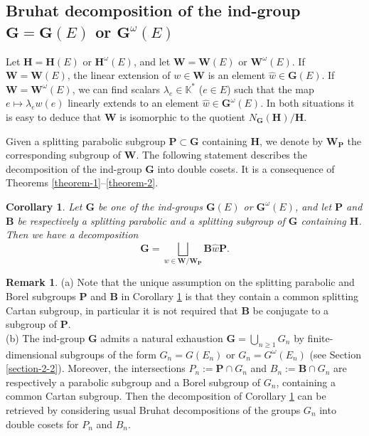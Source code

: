 \documentclass[12pt]{amsart}
\newtheorem{corollary}{Corollary}
\theoremstyle{definition}
\newtheorem{remark}{Remark}
\begin{document}
\subsection{Bruhat decomposition of the ind-group $\mathbf{G}=\mathbf{G}(E)$ or $\mathbf{G}^\omega(E)$}

\label{section-4-3}

Let $\mathbf{H}=\mathbf{H}(E)$ or $\mathbf{H}^\omega(E)$, and let $\mathbf{W}=\mathbf{W}(E)$ or $\mathbf{W}^\omega(E)$.
If $\mathbf{W}=\mathbf{W}(E)$, the linear extension of $w\in\mathbf{W}$ is an element $\hat{w}\in\mathbf{G}(E)$. If $\mathbf{W}=\mathbf{W}^\omega(E)$, we can find scalars $\lambda_e\in\mathbb{K}^*$ ($e\in E$) such that the map $e\mapsto \lambda_e w(e)$ linearly extends to an element $\hat{w}\in\mathbf{G}^\omega(E)$. In both situations it is easy to deduce that $\mathbf{W}$ is isomorphic to the quotient $N_\mathbf{G}(\mathbf{H})/\mathbf{H}$.

Given a splitting parabolic subgroup $\mathbf{P}\subset\mathbf{G}$ containing $\mathbf{H}$, we denote by $\mathbf{W}_\mathbf{P}$ the corresponding subgroup of $\mathbf{W}$. The following statement describes the decomposition of the ind-group $\mathbf{G}$ into double cosets. It is a consequence of Theorems \ref{theorem-1}--\ref{theorem-2}.

\begin{corollary}
\label{corollary-1-Bruhat}
Let $\mathbf{G}$ be one of the ind-groups $\mathbf{G}(E)$ or $\mathbf{G}^\omega(E)$, and let $\mathbf{P}$ and $\mathbf{B}$ be respectively a splitting parabolic and a splitting subgroup of $\mathbf{G}$ containing $\mathbf{H}$. Then we have a decomposition
\[\mathbf{G}=\bigsqcup_{w\in\mathbf{W}/\mathbf{W}_\mathbf{P}}\mathbf{B}\hat{w}\mathbf{P}.\]
\end{corollary}

\begin{remark}
{\rm (a)}
Note that the unique assumption on the splitting parabolic and Borel subgroups $\mathbf{P}$ and $\mathbf{B}$ in Corollary \ref{corollary-1-Bruhat} is that they contain a common splitting Cartan subgroup, in particular it is not required that $\mathbf{B}$ be conjugate to a subgroup of $\mathbf{P}$. \\
{\rm (b)}
The ind-group $\mathbf{G}$ admits a natural exhaustion $\mathbf{G}=\bigcup_{n\geq 1}G_n$ by finite-dimensional subgroups of the form $G_n=G(E_n)$ or $G_n=G^\omega(E_n)$ (see Section \ref{section-2-2}). Moreover, the intersections $P_n:=\mathbf{P}\cap G_n$ and $B_n:=\mathbf{B}\cap G_n$ are respectively a parabolic subgroup and a Borel subgroup of $G_n$, containing a common Cartan subgroup. Then the decomposition of Corollary \ref{corollary-1-Bruhat} can be retrieved by considering usual Bruhat decompositions of the groups $G_n$ into double cosets for $P_n$ and $B_n$.
\end{remark}
\end{document}
